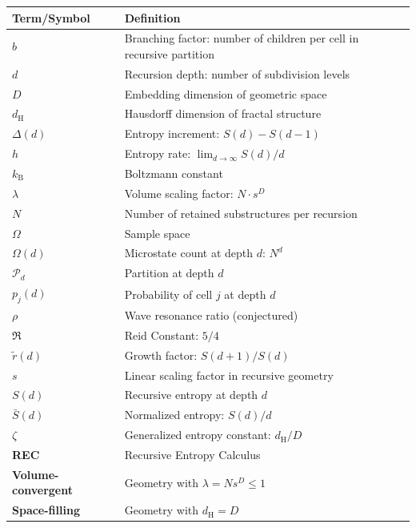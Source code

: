 \documentclass[11pt,a4paper]{article}
\theoremstyle{definition}
\theoremstyle{remark}
\newcommand{\kB}{k_{\mathrm{B}}}
\newcommand{\dH}{d_{\mathrm{H}}}
\newcommand{\Sbar}{\bar{S}}
\newcommand{\rtilde}{\tilde{r}}
\newcommand{\Partition}{\mathcal{P}}
\begin{document}
\begin{longtable}{@{}lp{10cm}@{}}
\toprule
\textbf{Term/Symbol} & \textbf{Definition} \\
\midrule
\endhead

$b$ & Branching factor: number of children per cell in recursive partition \\
$d$ & Recursion depth: number of subdivision levels \\
$D$ & Embedding dimension of geometric space \\
$\dH$ & Hausdorff dimension of fractal structure \\
$\Delta(d)$ & Entropy increment: $S(d) - S(d-1)$ \\
$h$ & Entropy rate: $\lim_{d \to \infty} S(d)/d$ \\
$\kB$ & Boltzmann constant \\
$\lambda$ & Volume scaling factor: $N \cdot s^D$ \\
$N$ & Number of retained substructures per recursion \\
$\Omega$ & Sample space \\
$\Omega(d)$ & Microstate count at depth $d$: $N^d$ \\
$\Partition_d$ & Partition at depth $d$ \\
$p_j(d)$ & Probability of cell $j$ at depth $d$ \\
$\rho$ & Wave resonance ratio (conjectured) \\
$\mathfrak{R}$ & Reid Constant: $5/4$ \\
$\rtilde(d)$ & Growth factor: $S(d+1)/S(d)$ \\
$s$ & Linear scaling factor in recursive geometry \\
$S(d)$ & Recursive entropy at depth $d$ \\
$\Sbar(d)$ & Normalized entropy: $S(d)/d$ \\
$\zeta$ & Generalized entropy constant: $\dH/D$ \\
\midrule
\textbf{REC} & Recursive Entropy Calculus \\
\textbf{Volume-convergent} & Geometry with $\lambda = Ns^D \leq 1$ \\
\textbf{Space-filling} & Geometry with $\dH = D$ \\
\bottomrule
\end{longtable}
\end{document}
